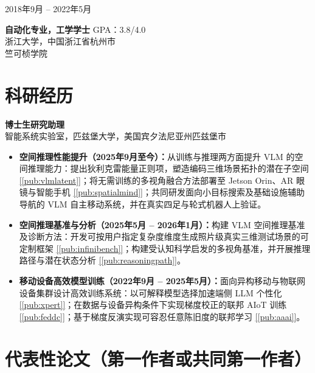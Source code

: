 \documentclass[10pt,letterpaper,fontset=fandol]{ctexart}
\newenvironment{datedentry}[1]{%
  \par\noindent
  \begin{minipage}[t]{3.0cm}\raggedright\small #1\end{minipage}%
  \hspace{0.25cm}%
  \begin{minipage}[t]{\dimexpr\linewidth-3.25cm\relax}\raggedright
}{\end{minipage}\par\vspace{3pt}}
\newcommand{\citeref}[1]{\hyperref[#1]{[\ref*{#1}]}}
\begin{document}
\begin{datedentry}{2018年9月 -- 2022年5月}
\textbf{自动化专业，工学学士} \hfill GPA：3.8/4.0\\
浙江大学，中国浙江省杭州市\\
竺可桢学院
\end{datedentry}

\section{科研经历}

\textbf{博士生研究助理}\\
智能系统实验室，匹兹堡大学，美国宾夕法尼亚州匹兹堡市
\begin{itemize}[leftmargin=1.1em,itemsep=1.5pt,topsep=2pt]
  \item \textbf{空间推理性能提升（2025年9月至今）：}从训练与推理两方面提升 VLM 的空间推理能力：提出狄利克雷能量正则项，塑造编码三维场景拓扑的潜在子空间 \citeref{pub:vlmlatent}；将无需训练的多视角融合方法部署至 Jetson Orin、AR 眼镜与智能手机 \citeref{pub:spatialmind}；共同研发面向小目标搜索及基础设施辅助导航的 VLM 自主移动系统，并在真实四足与轮式机器人上验证。
  \item \textbf{空间推理基准与分析（2025年5月 -- 2026年1月）：}构建 VLM 空间推理基准及诊断方法：开发可按用户指定复杂度维度生成照片级真实三维测试场景的可定制框架 \citeref{pub:infinibench}；构建受认知科学启发的多视角基准，并开展推理路径与潜在状态分析 \citeref{pub:reasoningpath}。
  \item \textbf{移动设备高效模型训练（2022年9月 -- 2025年5月）：}面向异构移动与物联网设备集群设计高效训练系统：以可解释模型选择加速端侧 LLM 个性化 \citeref{pub:xpert}；在数据与设备异构条件下实现梯度校正的联邦 AIoT 训练 \citeref{pub:feddc}；基于梯度反演实现可容忍任意陈旧度的联邦学习 \citeref{pub:aaai}。
\end{itemize}

\section{代表性论文（第一作者或共同第一作者）}
\end{document}
